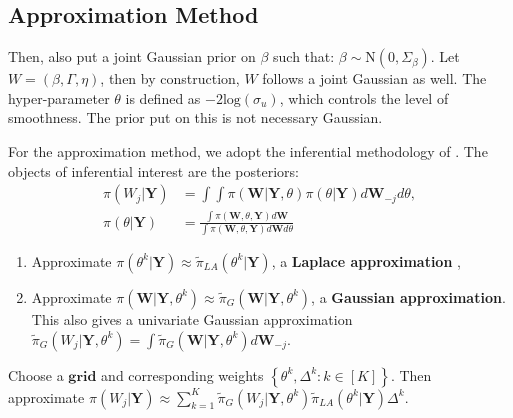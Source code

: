 \documentclass{beamer} %
\newcommand{\mb}[1]{\boldsymbol{#1}}
\newcommand{\bracevec}[1]{\left\lbrace #1 \right\rbrace}
\begin{document}
\subsection{Approximation Method}

\begin{frame}
Then, also put a joint Gaussian prior on $\beta$ such that: $\beta \sim \text{N}(0,\Sigma_{\beta})$.\newline
Let $W = (\beta, \Gamma, \eta)$, then by construction, $W$ follows a joint Gaussian as well. \newline
The hyper-parameter $\theta$ is defined as $-2\text{log}(\sigma_u)$, which controls the level of smoothness. The prior put on this is not necessary Gaussian.\newline
\end{frame}


\begin{frame}
For the approximation method, we adopt the inferential methodology of \citet{casecross}. \newline
The objects of inferential interest are the posteriors:\newline
\begin{equation}\begin{aligned}\label{eqn:approximation}
\pi(W_{j}|\mb{Y}) &= \int\int\pi(\mb{W}|\mb{Y},\theta)\pi(\theta|\mb{Y})d\mb{W}_{-j}d\theta, \\
\pi(\theta|\mb{Y}) &= \frac{\int\pi(\mb{W},\theta,\mb{Y})d\mb{W}}{\int\pi(\mb{W},\theta,\mb{Y})d\mb{W}d\theta}
\end{aligned}\end{equation}
\pause
\begin{enumerate}
\item Approximate $\pi(\theta^{k}|\mb{Y})\approx\tilde{\pi}_{LA}(\theta^{k}|\mb{Y})$, a \textbf{Laplace approximation} \citep{tierney},
\pause
\item Approximate $\pi(\mb{W}|\mb{Y},\theta^{k}) \approx \tilde{\pi}_{G}(\mb{W}|\mb{Y},\theta^{k})$, a \textbf{Gaussian approximation}. This also gives a univariate Gaussian approximation $\tilde{\pi}_{G}(W_{j}|\mb{Y},\theta^{k}) = \int\tilde{\pi}_{G}(\mb{W}|\mb{Y},\theta^{k})d\mb{W}_{-j}$.
\end{enumerate}
\pause
Choose a $\textbf{grid}$ and corresponding weights $\bracevec{\theta^{k},\Delta^{k}:k\in[K]}$. 
Then approximate $\pi(W_{j}|\mb{Y}) \approx \sum_{k=1}^{K}\tilde{\pi}_{G}(W_{j}|\mb{Y},\theta^{k})\tilde{\pi}_{LA}(\theta^{k}|\mb{Y})\Delta^{k}$.
\end{frame}
\end{document}
